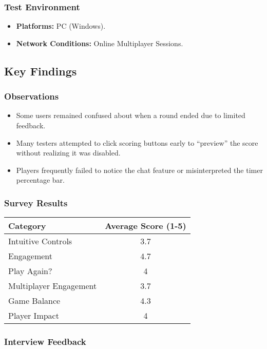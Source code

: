 \documentclass{article}
\begin{document}
\subsubsection{Test Environment}
\begin{itemize}
    \item \textbf{Platforms:} PC (Windows).
    \item \textbf{Network Conditions:} Online Multiplayer Sessions.
\end{itemize}

\subsection{Key Findings}

\subsubsection{Observations}
\begin{itemize}
    \item Some users remained confused about when a round ended due to limited feedback.
    \item Many testers attempted to click scoring buttons early to “preview” the score without realizing it was disabled.
    \item Players frequently failed to notice the chat feature or misinterpreted the timer percentage bar.
\end{itemize}


\subsubsection{Survey Results}
\begin{longtable}{|p{7cm}|c|}
\hline
\textbf{Category} & \textbf{Average Score (1-5)} \\
\hline
Intuitive Controls & 3.7 \\
\hline
Engagement & 4.7 \\
\hline
Play Again? & 4 \\
\hline
Multiplayer Engagement & 3.7 \\
\hline
Game Balance & 4.3 \\
\hline
Player Impact & 4 \\
\hline
\end{longtable}

\subsubsection{Interview Feedback}
\end{document}
